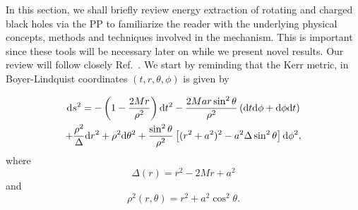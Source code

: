 In this section, we shall briefly review energy extraction of rotating and charged black holes via the \ac{PP} to familiarize the reader with the underlying physical concepts, methods and techniques involved in the mechanism. This is important since these tools will be necessary later on while we present novel results. Our review will follow closely Ref.~\cite{carroll}. We start by reminding that the Kerr metric, in Boyer-Lindquist coordinates $(t, r, \theta, \phi)$ is given by

\begin{multline}
  \mathrm{d} s^2 = -\left(1 - \frac{2 M r}{\rho^2}\right)\mathrm{d} t^2 - \frac{2 M a r \sin^2\theta}{\rho^2}\left( \mathrm{d} t \mathrm{d} \phi + \mathrm{d} \phi \mathrm{d} t \right)\\
  + \frac{\rho^2}{\Delta} \mathrm{d} r^2 + \rho^2 \mathrm{d}\theta^2 + \frac{\sin^2\theta}{\rho^2}\left[ (r^2 + a^2)^2 - a^2\Delta\sin^2\theta \right]\mathrm{d}\phi^2,
  \label{eq:kerr_penrose_review_kerr_metric}
\end{multline}
%
where
%
\begin{equation}
  \Delta(r) = r^2 - 2Mr + a^2
  \label{eq:kerr_penrose_review_kerr_delta}
\end{equation}
%
and
%
\begin{equation}
  \rho^2(r, \theta) = r^2 + a^2\cos^2\theta.
  \label{eq:kerr_penrose_review_kerr_rho}
\end{equation}

